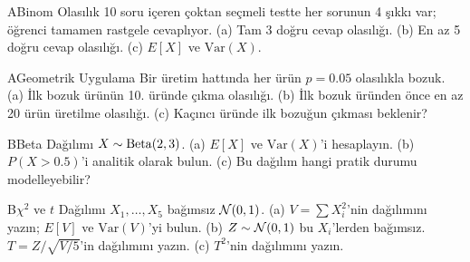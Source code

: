 
\alistirmalar

\begin{alistirma}[Al.5.5]{A}{Binom Olasılık}
10 soru içeren çoktan seçmeli testte her sorunun 4 şıkkı var; öğrenci tamamen rastgele cevaplıyor.
(a) Tam 3 doğru cevap olasılığı. (b) En az 5 doğru cevap olasılığı.
(c) $E[X]$ ve $\mathrm{Var}(X)$.
\end{alistirma}

\begin{alistirma}[Al.5.6]{A}{Geometrik Uygulama}
Bir üretim hattında her ürün $p = 0.05$ olasılıkla bozuk.
(a) İlk bozuk ürünün 10. üründe çıkma olasılığı.
(b) İlk bozuk üründen önce en az 20 ürün üretilme olasılığı.
(c) Kaçıncı üründe ilk bozuğun çıkması beklenir?
\end{alistirma}

\begin{alistirma}[Al.5.7]{B}{Beta Dağılımı}
$X \sim \operatorname{Beta}(2, 3)$.
(a) $E[X]$ ve $\mathrm{Var}(X)$'i hesaplayın.
(b) $P(X > 0.5)$'i analitik olarak bulun.
(c) Bu dağılım hangi pratik durumu modelleyebilir?
\end{alistirma}

\begin{alistirma}[Al.5.8]{B}{$\chi^2$ ve $t$ Dağılımı}
$X_1, \ldots, X_5$ bağımsız $\mathcal{N}(0,1)$.
(a) $V = \sum X_i^2$'nin dağılımını yazın; $E[V]$ ve $\mathrm{Var}(V)$'yi bulun.
(b) $Z \sim \mathcal{N}(0,1)$ bu $X_i$'lerden bağımsız. $T = Z/\sqrt{V/5}$'in dağılımını yazın.
(c) $T^2$'nin dağılımını yazın.
\end{alistirma}


